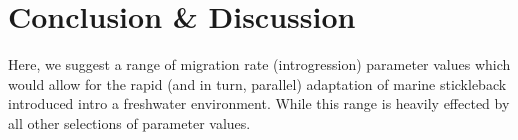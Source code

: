 \documentclass{article}
\begin{document}

\section{Conclusion \& Discussion}


Here, we suggest a range of migration rate (introgression) parameter values which would allow for the rapid (and in turn, parallel) adaptation 
of marine stickleback introduced intro a freshwater environment.
While this range is heavily effected by all other selections of parameter values. 

\newpage
{}

\end{document}
